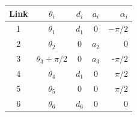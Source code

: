 \documentclass{../homework}
\begin{document}
\begin{problem}
\begin{parts}
     \begin{center}
     \begin{tabular}{|c|c|c|c|r|}
      \hline
      Link & $\theta_i$ & $d_i$ & $a_i$ & $\alpha_i$ \\
      \hline
      1 & $\theta_1$ & $d_1$ & 0 & $-\pi/2$ \\
      2 & $\theta_2$ & 0 & $a_2$ & 0 \\
      3 & $\theta_3 + \pi/2$ & 0 & $a_3$ & -$\pi/2$ \\
      4 & $\theta_4$ & $d_1$ & 0 & $\pi/2$ \\
      5 & $\theta_5$ & 0 & 0 & $\pi/2$ \\
      6 & $\theta_6$ & $d_6$ & 0 & 0 \\
      \hline
     \end{tabular}
     \end{center}
     


     
  \end{parts}
\end{problem}
\end{document}
